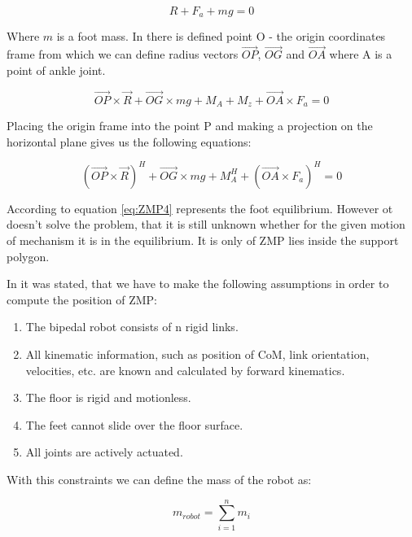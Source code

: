 \documentclass[12pt,a4paper]{report}
\begin{document}
		\begin{equation}\label{eq:ZMP2}
			R + F_a + mg = 0
		\end{equation}

		Where $m$ is a foot mass. In \cite{vukobratovic2004zero} there is defined  point O - the origin coordinates frame from which we can define radius vectors $\vec{OP}$, $\vec{OG}$ and $\vec{OA}$ where A is a point of ankle joint.

		\begin{equation}\label{eq:ZMP3}
			\vec{OP} \times \vec{R} + \vec{OG} \times mg + M_A + M_z + \vec{OA} \times F_a = 0
		\end{equation}

		Placing the origin frame into the point P and making a projection on the horizontal plane gives us the following equations: 

		\begin{equation}\label{eq:ZMP4}
			(\vec{OP} \times \vec{R})^H + \vec{OG} \times mg + M_A^H + (\vec{OA} \times F_a)^H = 0
		\end{equation}

		According to \cite{vukobratovic2004zero} equation \ref{eq:ZMP4} represents the foot equilibrium. However ot doesn't solve the problem, that it is still unknown whether for the given motion of mechanism it is in the equilibrium. It is only of ZMP lies inside the support polygon.
		
		In \cite{dekker2009zero} it was stated, that we have to make the following assumptions in order to compute the position of ZMP:

		\begin{enumerate}
			\item
				The bipedal robot consists of n rigid links.
			\item
				All kinematic information, such as position of CoM, link orientation, velocities, etc. are known and calculated by forward kinematics.
			\item
				The floor is rigid and motionless.
			\item
				The feet cannot slide over the floor surface.
			\item
				All joints are actively actuated.
		\end{enumerate}
	
		With this constraints we can define the mass of the robot as:
	
		\begin{equation}\label{eq:ZMP5}
			m_{robot} = \sum^n_{i=1}{m_i}
		\end{equation}
\end{document}
